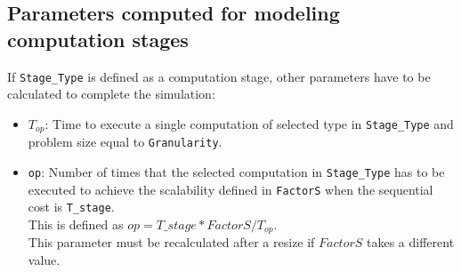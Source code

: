 \subsection{Parameters computed for modeling computation stages}
If \texttt{Stage\_Type} is defined as a computation stage, other parameters have to be calculated to complete the simulation:
\begin{itemize}
    \item \texttt{$T_{op}$}: Time to execute a single computation of selected type in \texttt{Stage\_Type} and problem size  equal to \texttt{Granularity}.%
    \item \texttt{op}: Number of times that the selected computation in \texttt{Stage\_Type} has to be executed to achieve the scalability defined in \texttt{FactorS} when the sequential cost is \texttt{T\_stage}.\\
    This is defined as $op=T\_stage*FactorS/T_{op}$. \\
    This parameter must be recalculated after a resize if $FactorS$ takes a different value.
\end{itemize}
